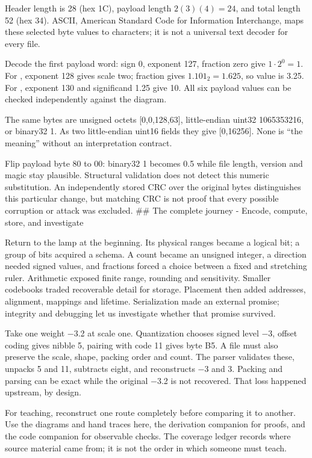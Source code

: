Header length is 28 (hex 1C), payload length \(2(3)(4)=24\), and total length 52 (hex 34). ASCII, American Standard Code for Information Interchange, maps these selected byte values to characters; it is not a universal text decoder for every file.

Decode the first payload word: sign 0, exponent 127, fraction zero give \(1\cdot2^0=1\). For , exponent 128 gives scale two; fraction gives \(1.101_2=1.625\), so value is 3.25. For , exponent 130 and significand 1.25 give 10. All six payload values can be checked independently against the diagram.

The same  bytes are unsigned octets {[}0,0,128,63{]}, little-endian uint32 1065353216, or binary32 1. As two little-endian uint16 fields they give {[}0,16256{]}. None is ``the meaning'' without an interpretation contract.

Flip payload byte 80 to 00: binary32 1 becomes 0.5 while file length, version and magic stay plausible. Structural validation does not detect this numeric substitution. An independently stored CRC over the original bytes distinguishes this particular change, but matching CRC is not proof that every possible corruption or attack was excluded. \#\# The complete journey - Encode, compute, store, and investigate

Return to the lamp at the beginning. Its physical ranges became a logical bit; a group of bits acquired a schema. A count became an unsigned integer, a direction needed signed values, and fractions forced a choice between a fixed and stretching ruler. Arithmetic exposed finite range, rounding and sensitivity. Smaller codebooks traded recoverable detail for storage. Placement then added addresses, alignment, mappings and lifetime. Serialization made an external promise; integrity and debugging let us investigate whether that promise survived.

Take one weight −3.2 at scale one. Quantization chooses signed level −3, offset coding gives nibble 5, pairing with code 11 gives byte B5. A file must also preserve the scale, shape, packing order and count. The parser validates these, unpacks 5 and 11, subtracts eight, and reconstructs −3 and 3. Packing and parsing can be exact while the original −3.2 is not recovered. That loss happened upstream, by design.

For teaching, reconstruct one route completely before comparing it to another. Use the diagrams and hand traces here, the derivation companion for proofs, and the code companion for observable checks. The coverage ledger records where source material came from; it is not the order in which someone must teach.

